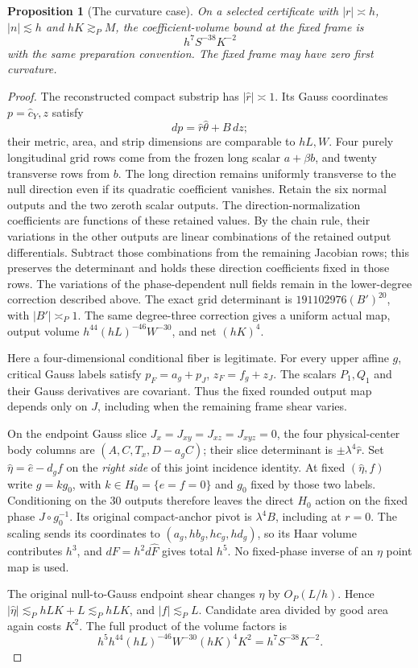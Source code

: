 \documentclass[11pt]{amsart}
\newtheorem{proposition}[theorem]{Proposition}
\theoremstyle{definition}
\theoremstyle{remark}
\numberwithin{equation}{section}
\begin{document}
\begin{proposition}[The curvature case]\label{low:4:sf:prop:newcurvaturecount}
On a selected certificate with $|r|\asymp h$, $|n|\lesssim h$ and $hK\gtrsim_PM$, the coefficient-volume bound at the fixed frame is
\[
 \boxed{\quad h^7S^{-38}K^{-2}\quad}
\]
with the same preparation convention. The fixed frame may have zero first curvature.
\end{proposition}
\begin{proof}
The reconstructed compact substrip has $|\widehat r|\asymp1$. Its Gauss coordinates $p=\widehat c_Y,z$ satisfy
\[
dp=\widehat r\widehat\theta+B\,dz;
\]
their metric, area, and strip dimensions are comparable to $hL,W$. Four purely longitudinal grid rows come from the frozen long scalar $a+\beta b$, and twenty transverse rows from $b$. The long direction remains uniformly transverse to the null direction even if its quadratic coefficient vanishes. Retain the six normal outputs and the two zeroth scalar outputs. The direction-normalization coefficients are functions of these retained values. By the chain rule, their variations in the other outputs are linear combinations of the retained output differentials. Subtract those combinations from the remaining Jacobian rows; this preserves the determinant and holds these direction coefficients fixed in those rows. The variations of the phase-dependent null fields remain in the lower-degree correction described above. The exact grid determinant is $191102976(B')^{20}$, with $|B'|\asymp_P1$. The same degree-three correction gives a uniform actual map, output volume $h^{44}(hL)^{-46}W^{-30}$, and net $(hK)^4$.

Here a four-dimensional conditional fiber is legitimate. For every upper affine $g$, critical Gauss labels satisfy $p_F=a_g+p_J$, $z_F=f_g+z_J$. The scalars $P_1,Q_1$ and their Gauss derivatives are covariant. Thus the fixed rounded output map depends only on $J$, including when the remaining frame shear varies. 

On the endpoint Gauss slice $J_x=J_{xy}=J_{xz}=J_{xyz}=0$, the four physical-center body columns are $(A,C,T_x,D-a_gC)$; their slice determinant is $\pm\lambda^4\widehat r$. Set $\widehat\eta=\widehat e-d_gf$ on the \emph{right side} of this joint incidence identity. At fixed $(\widehat\eta,f)$ write $g=k g_0$, with $k\in H_0=\{e=f=0\}$ and $g_0$ fixed by those two labels. Conditioning on the $30$ outputs therefore leaves the direct $H_0$ action on the fixed phase $J\circ g_0^{-1}$. Its original compact-anchor pivot is $\lambda^4B$, including at $r=0$. The scaling sends its coordinates to $(a_g,hb_g,hc_g,hd_g)$, so its Haar volume contributes $h^3$, and $dF=h^2d\widehat F$ gives total $h^5$. No fixed-phase inverse of an $\eta$ point map is used.

The original null-to-Gauss endpoint shear changes $\eta$ by $O_P(L/h)$. Hence $|\widehat\eta|\lesssim_P hLK+L\lesssim_P hLK$, and $|f|\lesssim_PL$. Candidate area divided by good area again costs $K^2$. The full product of the volume factors is
\[
h^5h^{44}(hL)^{-46}W^{-30}(hK)^4K^2
 =h^7S^{-38}K^{-2}.
\]
\end{proof}
\end{document}
